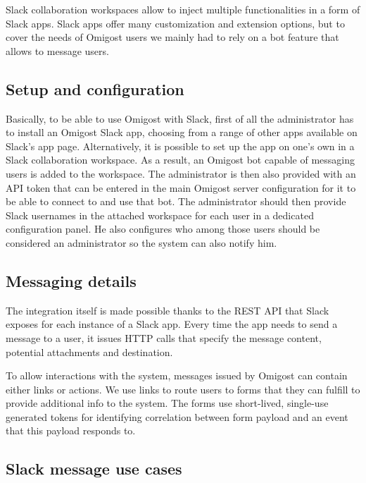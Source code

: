 \documentclass[licencjacka,en]{thesisclass}
\begin{document}
    Slack collaboration workspaces allow to inject multiple functionalities
    in a form of Slack apps.
    Slack apps offer many customization and extension options, but to cover
    the needs of Omigost users we mainly had to rely on a bot feature
    that allows to message users.

    \subsection{Setup and configuration}

    Basically, to be able to use Omigost with Slack, first of all the administrator
    has to install an Omigost Slack app, choosing from a range of other apps
    available on Slack's app page.
    Alternatively, it is possible to set up the app on one's own
    in a Slack collaboration workspace.
    As a result, an Omigost bot capable of messaging users is added to the workspace.
    The administrator is then also provided with an API token that can be entered in
    the main Omigost server configuration for it to be able
    to connect to and use that bot.
    The administrator should then provide Slack usernames in the attached
    workspace for each user in a dedicated configuration panel.
    He also configures who among those users should be considered an administrator
    so the system can also notify him.

    \subsection{Messaging details}

    The integration itself is made possible thanks to the REST API
    that Slack exposes for each instance of a Slack app.
    Every time the app needs to send a message to a user, it issues HTTP
    calls that specify the message content, potential attachments and destination.

    To allow interactions with the system, messages issued by Omigost
    can contain either links or actions.
    We use links to route users to forms that they can fulfill
    to provide additional info to the system.
    The forms use short-lived, single-use generated tokens for identifying
    correlation between form payload and an event that this payload responds to.

    \subsection{Slack message use cases}
\end{document}
